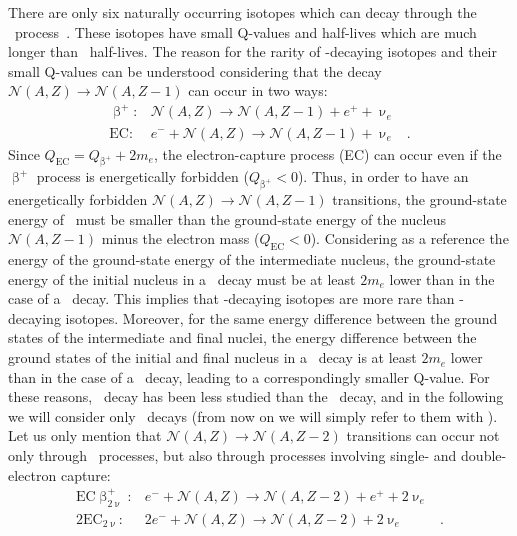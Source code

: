 There are only six naturally occurring isotopes which can decay through the \nnbbp\
process~\cite{Haxton1985}. These isotopes have small Q-values and half-lives which are much
longer than \nnbbm\ half-lives. The reason for the rarity of \nnbbp-decaying isotopes and
their small Q-values can be understood considering that the decay $\mathcal{N}(A,Z)
\rightarrow \mathcal{N}(A,Z-1)$ can occur in two ways:
\[
  \begin{array}{lrl}
    \upbeta^+: &
      \mathcal{N}(A,Z) \rightarrow \mathcal{N}(A,Z-1) + e^+ + \upnu_e & \\
    \text{EC}: &
      e^- + \mathcal{N}(A,Z) \rightarrow \mathcal{N}(A,Z-1) + \upnu_e &.
  \end{array}
\]
Since $Q_\text{EC} = Q_{\upbeta^+}+2m_e$, the electron-capture process (EC) can occur even
if the $\upbeta^+$ process is energetically forbidden ($Q_{\upbeta^+} < 0$). Thus, in
order to have an energetically forbidden $\mathcal{N}(A,Z)\rightarrow\mathcal{N}(A,Z-1)$
transitions, the ground-state energy of \NAZ\ must be smaller than the ground-state energy
of the nucleus $\mathcal{N}(A,Z-1)$ minus the electron mass ($Q_\text{EC}<0$).
Considering as a reference the energy of the ground-state energy of the intermediate
nucleus, the ground-state energy of the initial nucleus in a \nnbbp\ decay must be at
least $2m_e$ lower than in the case of a \nnbbm\ decay. This implies that \nnbbp-decaying
isotopes are more rare than \nnbbm-decaying isotopes. Moreover, for the same energy
difference between the ground states of the intermediate and final nuclei, the energy
difference between the ground states of the initial and final nucleus in a \nnbbp\ decay
is at least $2m_e$ lower than in the case of a \nnbbm\ decay, leading to a correspondingly
smaller Q-value. For these reasons, \nnbbp\ decay has been less studied than the
\nnbbm\ decay, and in the following we will consider only \nnbbm\ decays (from now on we
will simply refer to them with \nnbb). Let us only mention that $\mathcal{N}(A,Z)
\rightarrow \mathcal{N}(A,Z-2)$ transitions can occur not only through \nnbbp\ processes,
but also through processes involving single- and double-electron capture:
\[
  \begin{array}{lrl}
    \text{EC}\upbeta^+_{2\upnu}: &
      e^- + \mathcal{N}(A,Z) \rightarrow \mathcal{N}(A,Z-2) + e^+ + 2\upnu_e & \\
    2\text{EC}_{2\upnu}: &
      2e^- + \mathcal{N}(A,Z) \rightarrow \mathcal{N}(A,Z-2) + 2\upnu_e &.
  \end{array}
\]

